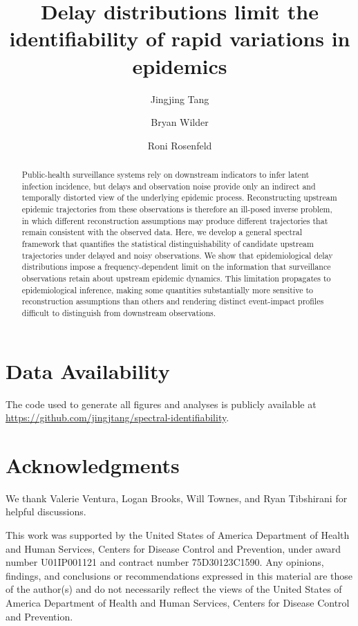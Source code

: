 \documentclass[10pt,twocolumn]{article}
\title{Delay distributions limit the identifiability of rapid variations in epidemics}
\author[1]{Jingjing Tang}
\author[2]{Bryan Wilder}
\author[2]{Roni Rosenfeld}
\affil[1]{Computational Biology Department, Carnegie Mellon University}
\affil[2]{Machine Learning Department, Carnegie Mellon University}
\date{}
\begin{document}
\maketitle

\begin{abstract}
Public-health surveillance systems rely on downstream indicators to infer latent infection incidence, but delays and observation noise provide only an indirect and temporally distorted view of the underlying epidemic process. Reconstructing upstream epidemic trajectories from these observations is therefore an ill-posed inverse problem, in which different reconstruction assumptions may produce different trajectories that remain consistent with the observed data. Here, we develop a general spectral framework that quantifies the statistical distinguishability of candidate upstream trajectories under delayed and noisy observations. We show that epidemiological delay distributions impose a frequency-dependent limit on the information that surveillance observations retain about upstream epidemic dynamics. This limitation propagates to epidemiological inference, making some quantities substantially more sensitive to reconstruction assumptions than others and rendering distinct event-impact profiles difficult to distinguish from downstream observations.
\end{abstract}








\section*{Data Availability}

The code used to generate all figures and analyses is publicly available at
\url{https://github.com/jingjtang/spectral-identifiability}.

\section*{Acknowledgments}
We thank Valerie Ventura, Logan Brooks, Will Townes, and Ryan Tibshirani for helpful discussions.

This work was supported by the United States of America Department of Health and Human Services, Centers for Disease Control and Prevention, under award number U01IP001121 and contract number 75D30123C1590. Any opinions, findings, and conclusions or recommendations expressed in this material are those of the author(s) and do not necessarily reflect the views of the United States of America Department of Health and Human Services, Centers for Disease Control and Prevention.






\clearpage

\appendix
\setcounter{figure}{0}
\renewcommand{\thefigure}{S\arabic{figure}}





\end{document}

